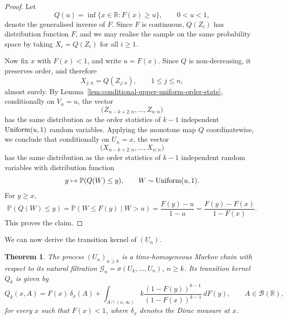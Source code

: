 \documentclass[12pt]{article}
\newtheorem{theorem}{Theorem}[section]
\theoremstyle{definition}
\begin{document}
\begin{proof}
Let
\[
Q(u)=\inf\{x\in\mathbb{R}:F(x)\ge u\}, \qquad 0<u<1,
\]
denote the generalised inverse of $F$. Since $F$ is continuous, $Q(Z_i)$ has distribution function $F$, and we may realise the sample on the same probability space by taking $X_i=Q(Z_i)$ for all $i\ge1$.

Now fix $x$ with $F(x)<1$, and write $u=F(x)$. Since $Q$ is non-decreasing, it preserves order, and therefore
\[
X_{j:n}=Q(Z_{j:n}), \qquad 1\le j\le n,
\]
almost surely. By Lemma~\ref{lem:conditional-upper-uniform-order-stats}, conditionally on $V_n=u$, the vector
\[
\bigl(Z_{n-k+2:n},\dots,Z_{n:n}\bigr)
\]
has the same distribution as the order statistics of $k-1$ independent ${\rm Uniform}(u,1)$ random variables. Applying the monotone map $Q$ coordinatewise, we conclude that conditionally on $U_n=x$, the vector
\[
\bigl(X_{n-k+2:n},\dots,X_{n:n}\bigr)
\]
has the same distribution as the order statistics of $k-1$ independent random variables with distribution function
\[
y\mapsto \mathbb{P}(Q(W)\le y),
\qquad W\sim {\rm Uniform}(u,1).
\]
For $y\ge x$,
\[
\mathbb{P}(Q(W)\le y)
=
\mathbb{P}(W\le F(y)\mid W>u)
=
\frac{F(y)-u}{1-u}
=
\frac{F(y)-F(x)}{1-F(x)}.
\]
This proves the claim.
\end{proof}

\medskip

We can now derive the transition kernel of $(U_n)$.

\begin{theorem}
\label{thm:transition-kernel-Un}
The process $(U_n)_{n\ge k}$ is a time-homogeneous Markov chain 
with respect to its natural filtration
$\mathcal{G}_n=\sigma(U_k,\dots,U_n)$, $n\ge k$.
Its transition kernel $Q_k$ is given by
\begin{equation}
\label{eq:transition-kernel-Un}
Q_k(x,A)
=
F(x)\,\delta_x(A)
+
\int_{A\cap(x,\infty)}
k\frac{(1-F(y))^{k-1}}{(1-F(x))^{k-1}}\,dF(y),
\qquad A\in\mathcal{B}(\mathbb{R}),
\end{equation}
for every $x$ such that $F(x)<1$, where $\delta_x$ denotes the Dirac measure at $x$.
\end{theorem}
\end{document}
